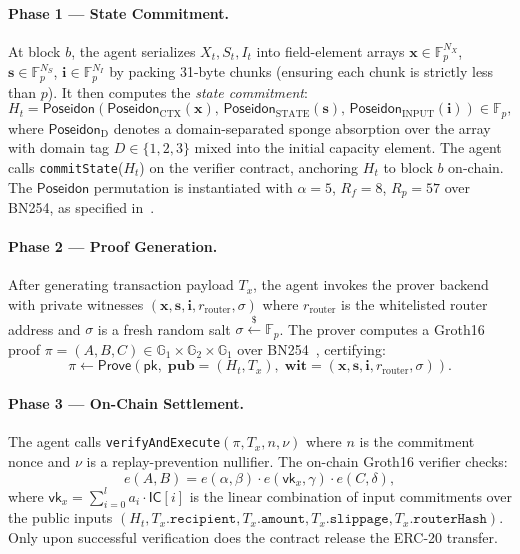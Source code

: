 \documentclass[final,5p,times,twocolumn]{elsarticle}
\theoremstyle{plain}
\theoremstyle{definition}
\theoremstyle{remark}
\newcommand{\F}{\mathbb{F}}
\newcommand{\poseidon}{\textsf{Poseidon}}
\begin{document}
\paragraph{Phase 1 — State Commitment.}
At block $b$, the agent serializes $X_t, S_t, I_t$ into field-element arrays
$\mathbf{x} \in \F_p^{N_X}$, $\mathbf{s} \in \F_p^{N_S}$, $\mathbf{i} \in \F_p^{N_I}$
by packing 31-byte chunks (ensuring each chunk is strictly less than $p$).
It then computes the \emph{state commitment}:
\begin{equation}
  H_t = \poseidon\!\left(
    \poseidon_{\mathrm{CTX}}(\mathbf{x}),\,
    \poseidon_{\mathrm{STATE}}(\mathbf{s}),\,
    \poseidon_{\mathrm{INPUT}}(\mathbf{i})
  \right) \in \F_p,
  \label{eq:commitment}
\end{equation}
where $\poseidon_{\mathrm{D}}$ denotes a domain-separated sponge absorption
over the array with domain tag $D \in \{1,2,3\}$ mixed into the initial
capacity element. The agent calls \texttt{commitState}($H_t$) on the verifier
contract, anchoring $H_t$ to block $b$ on-chain. The $\poseidon$ permutation
is instantiated with $\alpha=5$, $R_f=8$, $R_p=57$ over BN254, as specified
in~\cite{grassi2021poseidon}.

\paragraph{Phase 2 — Proof Generation.}
After generating transaction payload $T_x$, the agent invokes the prover
backend with private witnesses $(\mathbf{x}, \mathbf{s}, \mathbf{i},
r_{\mathrm{router}}, \sigma)$ where $r_{\mathrm{router}}$ is the whitelisted
router address and $\sigma$ is a fresh random salt $\sigma \xleftarrow{\$} \F_p$.
The prover computes a Groth16 proof $\pi = (A, B, C) \in
\mathbb{G}_1 \times \mathbb{G}_2 \times \mathbb{G}_1$ over BN254~\cite{groth2016}, certifying:
\begin{equation}
  \pi \leftarrow \mathsf{Prove}\!\left(
    \mathsf{pk},\;
    \mathbf{pub} = (H_t, T_x),\;
    \mathbf{wit} = (\mathbf{x}, \mathbf{s}, \mathbf{i}, r_{\mathrm{router}}, \sigma)
  \right).
  \label{eq:prove}
\end{equation}

\paragraph{Phase 3 — On-Chain Settlement.}
The agent calls \texttt{verifyAndExecute}$(\pi, T_x, n, \nu)$ where $n$ is the
commitment nonce and $\nu$ is a replay-prevention nullifier. The on-chain
Groth16 verifier checks:
\begin{equation}
  e(A, B) = e(\alpha, \beta)\cdot e(\mathsf{vk}_x, \gamma)\cdot e(C, \delta),
  \label{eq:pairing}
\end{equation}
where $\mathsf{vk}_x = \sum_{i=0}^{l} a_i \cdot \mathsf{IC}[i]$ is the
linear combination of input commitments over the public inputs
$(H_t, T_x.\mathtt{recipient}, T_x.\mathtt{amount}, T_x.\mathtt{slippage},
T_x.\mathtt{routerHash})$. Only upon successful verification does the contract
release the ERC-20 transfer.
\end{document}
